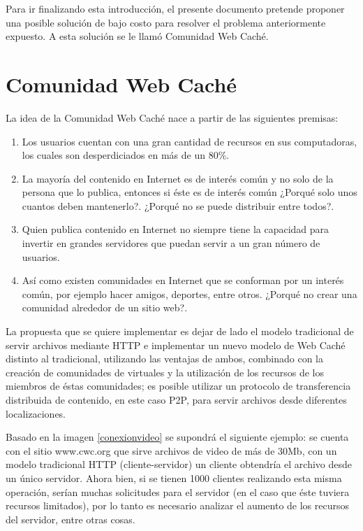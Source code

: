 Para ir finalizando esta introducción, el presente documento pretende proponer una posible solución de bajo costo para resolver el problema anteriormente expuesto. A esta solución se le llamó Comunidad Web Caché. 


\section{Comunidad Web Caché}

La idea de la Comunidad Web Caché nace a partir de las siguientes premisas:

\begin{enumerate}
\item Los usuarios cuentan con una gran cantidad de recursos en sus computadoras, los cuales son desperdiciados en más de un 80\%.
\item La mayoría del contenido en Internet es de interés común y no solo de la persona que lo publica, entonces si éste es de interés común ¿Porqué solo unos cuantos deben mantenerlo?. ¿Porqué no se puede distribuir entre todos?.
\item Quien publica contenido en Internet no siempre tiene la capacidad para invertir en grandes servidores que puedan servir a un gran número de usuarios.
\item Así como existen comunidades en Internet que se conforman por un interés común, por ejemplo hacer amigos, deportes, entre otros. ¿Porqué no crear una comunidad alrededor de un sitio web?.
\end{enumerate}

La propuesta que se quiere implementar es dejar de lado el modelo tradicional de servir archivos mediante HTTP e implementar un nuevo modelo de Web Caché distinto al tradicional, utilizando las ventajas de ambos, combinado con la creación de comunidades de virtuales y la utilización de los recursos de los miembros de éstas comunidades; es posible utilizar un protocolo de transferencia distribuida de contenido, en este caso P2P, para servir archivos desde diferentes localizaciones.

Basado en la imagen \ref{conexionvideo} se supondrá el siguiente ejemplo: se cuenta con el sitio www.cwc.org que sirve archivos de video de más de 30Mb, con un modelo tradicional HTTP (cliente-servidor) un cliente obtendría el archivo desde un único servidor. Ahora bien, si se tienen 1000 clientes realizando esta misma operación, serían muchas solicitudes para el servidor (en el caso que éste tuviera recursos limitados), por lo tanto es necesario analizar el aumento de los recursos del servidor, entre otras cosas. 


